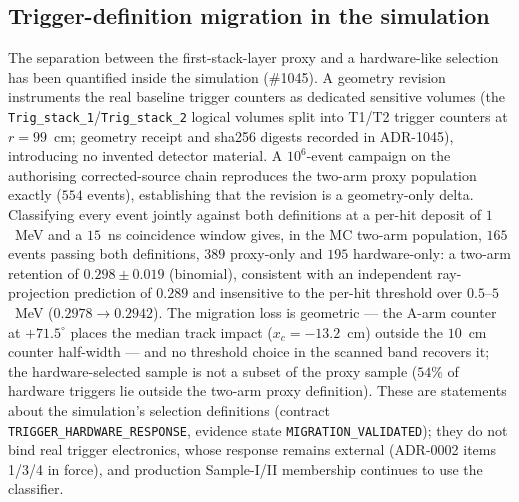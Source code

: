 
\subsection{Trigger-definition migration in the simulation}
\label{sec:trigger-migration}

The separation between the first-stack-layer proxy and a hardware-like selection has been quantified inside the simulation (\#1045). A geometry revision instruments the real baseline trigger counters as dedicated sensitive volumes (the \texttt{Trig\_stack\_1}/\texttt{Trig\_stack\_2} logical volumes split into T1/T2 trigger counters at $r=99$~cm; geometry receipt and sha256 digests recorded in ADR-1045), introducing no invented detector material. A $10^6$-event campaign on the authorising corrected-source chain reproduces the two-arm proxy population exactly ($554$ events), establishing that the revision is a geometry-only delta. Classifying every event jointly against both definitions at a per-hit deposit of $1$~MeV and a $15$~ns coincidence window gives, in the MC two-arm population, $165$ events passing both definitions, $389$ proxy-only and $195$ hardware-only: a two-arm retention of $0.298\pm0.019$ (binomial), consistent with an independent ray-projection prediction of $0.289$ and insensitive to the per-hit threshold over $0.5$--$5$~MeV ($0.2978\to0.2942$). The migration loss is geometric --- the A-arm counter at $+71.5^{\circ}$ places the median track impact ($x_c=-13.2$~cm) outside the $10$~cm counter half-width --- and no threshold choice in the scanned band recovers it; the hardware-selected sample is not a subset of the proxy sample ($54\%$ of hardware triggers lie outside the two-arm proxy definition). These are  statements about the simulation's selection definitions (contract \texttt{TRIGGER\_HARDWARE\_RESPONSE}, evidence state \texttt{MIGRATION\_VALIDATED}); they do not bind real trigger electronics, whose response remains external (ADR-0002 items 1/3/4 in force), and production Sample-I/II membership continues to use the  classifier.


